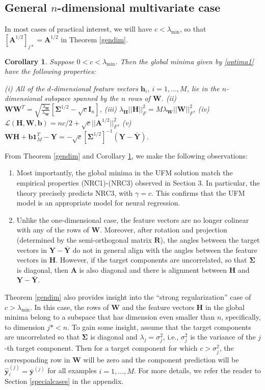 \documentclass{article}
\theoremstyle{plain}
\newtheorem{corollary}[theorem]{Corollary}
\theoremstyle{definition}
\theoremstyle{remark}
\newcommand{\bW}{{\mathbf W}}
\newcommand{\bY}{{\mathbf Y}}
\newcommand{\bR}{{\mathbf R}}
\newcommand{\bA}{{\mathbf A}}
\newcommand{\bH}{{\mathbf H}}
\newcommand{\bI}{{\mathbf I}}
\newcommand{\bhi}{{\mathbf h}_i}
\newcommand{\by}{{\mathbf y}}
\newcommand{\byb}{{\bar{\mathbf y}}}
\newcommand{\bYb}{{\bar{\mathbf Y}}}
\newcommand{\bb}{{\mathbf b}}
\newcommand{\bSigma}{{\mathbf \Sigma}}
\newcommand{\lmin}{\lambda_{\text{min}}}
\newcommand{\lH}{\lambda_{\bH}}
\newcommand{\lW}{\lambda_{\bW}}
\begin{document}
\subsection{General $n$-dimensional multivariate case}
In most cases of practical interest, we will have $c < \lmin$, so that $[\bA^{1/2}]_{j*} = \bA^{1/2}$ in Theorem \ref{gendim}. 
\begin{corollary} \label{conseq}
Suppose $0 < c < \lambda_{\text{min}}$. Then the global minima given by \eqref{optima1} have the following properties:

(i) All of the $d$-dimensional feature vectors $\bhi$, $i=1,\ldots,M$, lie in the $n$-dimensional subspace spanned by the $n$ rows of $\bW$. 
(ii) $\bW \bW^{T} = \sqrt{\frac{\lH}{\lW}} \left[\bSigma^{1/2} -\sqrt{c}\bI_n \right]$, 
(iii) $\lH ||\bH||_F^2= M \lW ||\bW||_F^2$, 
(iv) $\mathcal{L}(\bH, \bW, \bb)=nc/2+\sqrt{c} ||\bA^{1/2}||_F^2$, 
(v) $\bW \bH +\bb \mathbf{1}_M^T-\bY=-\sqrt{c}[\bSigma^{1/2}]^{-1}(\bY-\bYb)$. 
\end{corollary}
From Theorem \ref{gendim} and Corollary \ref{conseq}, we make the following observations:
\begin{enumerate}
    \item Most importantly, the global minima in the UFM solution match the empirical properties (NRC1)-(NRC3) observed in Section 3. In particular, the theory precisely predicts NRC3, with $\gamma = c$. This confirms that the UFM model is an appropriate model for neural regression. 
    \item Unlike the one-dimensional case, the feature vectors are no longer colinear with any of the rows of $\bW$. Moreover, after rotation and projection (determined by the semi-orthogonal matrix $\bR$), the angles between the target vectors in $\bY - \bYb$ do not in general align with the angles between the feature vectors in $\bH$. However, if the target components are uncorrelated, so that $\bSigma$ is diagonal, then $\bA$ is also diagonal and there is alignment between $\bH$ and $\bY - \bYb$.
\end{enumerate}

Theorem \ref{gendim} also provides insight into the ``strong regularization'' case of $c > \lmin$. In this case, the rows of $\bW$ and the feature vectors $\bH$ in the global minima belong to a subspace that has dimension even smaller than $n$, specifically, to dimension $j* <n$. To gain some insight, assume that the target components are uncorrelated so that $\bSigma$ is diagonal and $\lambda_j = \sigma_j^2$, i.e., $\sigma_j^2$ is the variance of the $j$-th target component. Then for a target component for which $c > \sigma_j^2$, the corresponding row in $\bW$ will be zero and the component prediction will be $\hat{\by}_i^{(j)} = \byb^{(j)}$ for all examples $i=1,\ldots,M$. For more details, we refer the reader to Section \ref{specialcases} in the appendix.
\end{document}
